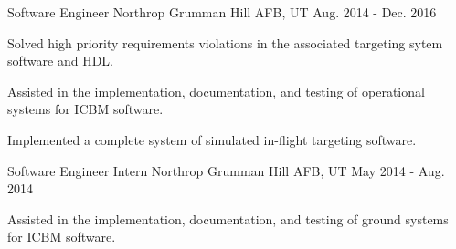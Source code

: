 \begin{cventries}
\cventry
{Software Engineer} %
{Northrop Grumman} %
{Hill AFB, UT} %
{Aug. 2014 - Dec. 2016} %
{ %
\begin{cvitems}
\item \small Solved high priority requirements violations in the associated targeting sytem software and HDL.
\item \small Assisted in the implementation, documentation, and testing of operational systems for ICBM software.
\item \small Implemented a complete system of simulated in-flight targeting software.
\end{cvitems}
}



\cventry
{Software Engineer Intern} %
{Northrop Grumman} %
{Hill AFB, UT} %
{May 2014 - Aug. 2014} %
{ %
\begin{cvitems}
\item \small Assisted in the implementation, documentation, and testing of ground systems for ICBM software.
\end{cvitems}
}

\end{cventries}